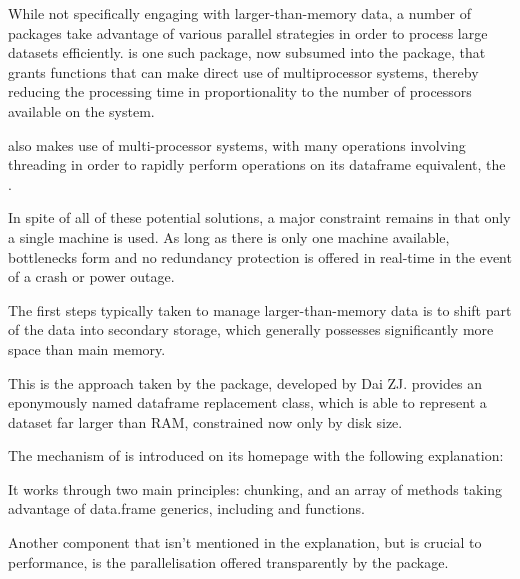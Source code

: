 
While not specifically engaging with larger-than-memory data, a number
of packages take advantage of various parallel strategies in order to
process large datasets efficiently.  is one such
package, now subsumed into the  package, that grants
functions that can make direct use of multiprocessor systems, thereby
reducing the processing time in proportionality to the number of
processors available on the system.

 also makes use of multi-processor systems, with many
operations involving threading in order to rapidly perform operations on
its dataframe equivalent, the .

In spite of all of these potential solutions, a major constraint remains
in that only a single machine is used. As long as there is only one
machine available, bottlenecks form and no redundancy protection is
offered in real-time in the event of a crash or power outage.

The first steps typically taken to manage larger-than-memory data is to
shift part of the data into secondary storage, which generally possesses
significantly more space than main memory.

This is the approach taken by the  package, developed
by Dai ZJ.  provides an eponymously named dataframe
replacement class, which is able to represent a dataset far larger than
RAM, constrained now only by disk size\cite{zj20}.

The mechanism of  is introduced on its homepage with the
following explanation:


It works through two main principles: chunking, and an array of methods
taking advantage of data.frame generics, including  and
 functions.

Another component that isn't mentioned in the explanation, but is
crucial to performance, is the parallelisation offered transparently by
the package.

